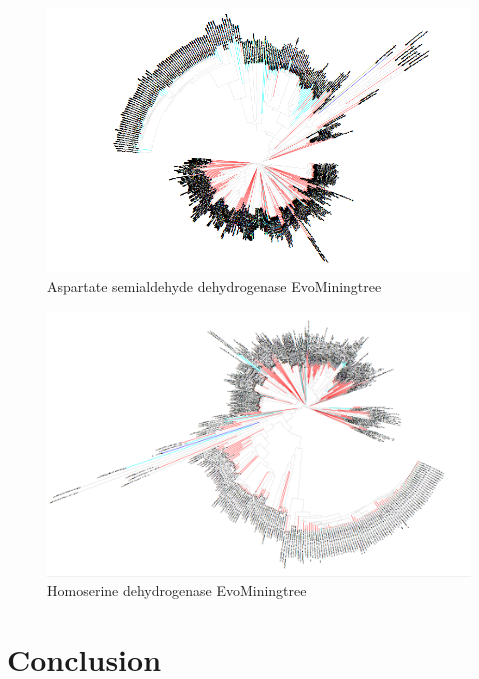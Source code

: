 \documentclass[12pt,twoside]{reedthesis}
\begin{document}
\begin{figure}[h!tbp]
  \includegraphics[angle = 180,scale = 0.25]{chapter5/tree19.png}
  \caption[Aspartate semialdehyde dehydrogenase EvoMiningtree]{\normalsize{Aspartate semialdehyde dehydrogenase EvoMiningtree}}
  \label{fig:Aspartate_semialdehyde_dehydrogenase_evo_tree}
  \end{figure}\begin{figure}[h!tbp]
  \centering
  \includegraphics[angle = 180,scale = 0.25]{chapter5/tree20.png}
  \caption[Homoserine dehydrogenase EvoMiningtree]{\normalsize{Homoserine dehydrogenase EvoMiningtree}}
  \label{fig:Homoserine_dehydrogenase_evo_tree}
  \end{figure}
  
  \clearpage 
  
  \chapter*{Conclusion}\label{conclusion}
  
\end{document}
